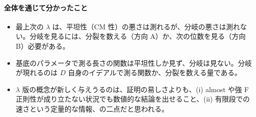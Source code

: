 \documentclass[11pt,a4paper]{ltjsarticle}
\theoremstyle{plain}
\theoremstyle{definition}
\theoremstyle{remark}
\theoremstyle{plain}
\begin{document}
\paragraph{全体を通じて分かったこと}
\begin{itemize}
  \item 最上次の $\lambda$ は、平坦性（CM 性）の悪さは測れるが、分岐の悪さは測れない。分岐を見るには、分裂を数える（方向 A）か、次の位数を見る（方向 B）必要がある。
  \item 基底のパラメータで測る長さの関数は平坦性しか見ず、分岐は見ない。分岐が現れるのは $D$ 自身のイデアルで測る関数か、分裂を数える量である。
  \item $\lambda$ 版の概念が新しく与えうるのは、証明の易しさよりも、(i) almost や強 F 正則性が成り立たない状況でも数値的な結論を出せること、(ii) 有限段での速さという定量的な情報、の二点だと思われる。
\end{itemize}
\end{document}

